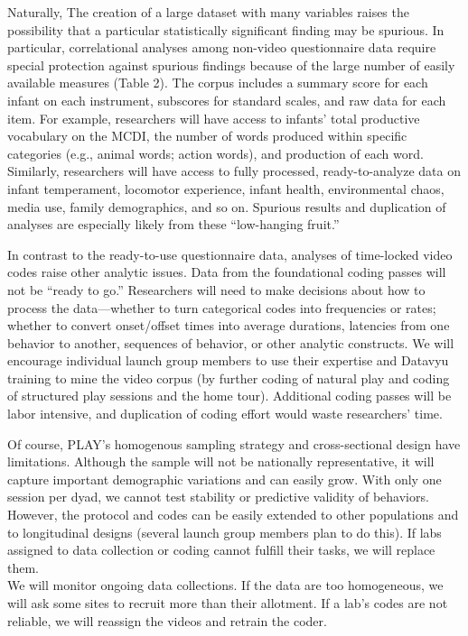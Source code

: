 \documentclass[english,man]{apa6}
\theoremstyle{definition}
\theoremstyle{definition}
\theoremstyle{definition}
\theoremstyle{remark}
\begin{document}
Naturally, The creation of a large dataset with many variables raises
the possibility that a particular statistically significant finding may
be spurious. In particular, correlational analyses among non-video
questionnaire data require special protection against spurious findings
because of the large number of easily available measures (Table 2). The
corpus includes a summary score for each infant on each instrument,
subscores for standard scales, and raw data for each item. For example,
researchers will have access to infants' total productive vocabulary on
the MCDI, the number of words produced within specific categories (e.g.,
animal words; action words), and production of each word. Similarly,
researchers will have access to fully processed, ready-to-analyze data
on infant temperament, locomotor experience, infant health,
environmental chaos, media use, family demographics, and so on. Spurious
results and duplication of analyses are especially likely from these
\enquote{low-hanging fruit.}

In contrast to the ready-to-use questionnaire data, analyses of
time-locked video codes raise other analytic issues. Data from the
foundational coding passes will not be \enquote{ready to go.}
Researchers will need to make decisions about how to process the
data---whether to turn categorical codes into frequencies or rates;
whether to convert onset/offset times into average durations, latencies
from one behavior to another, sequences of behavior, or other analytic
constructs. We will encourage individual launch group members to use
their expertise and Datavyu training to mine the video corpus (by
further coding of natural play and coding of structured play sessions
and the home tour). Additional coding passes will be labor intensive,
and duplication of coding effort would waste researchers' time.

Of course, PLAY's homogenous sampling strategy and cross-sectional
design have limitations. Although the sample will not be nationally
representative, it will capture important demographic variations and can
easily grow. With only one session per dyad, we cannot test stability or
predictive validity of behaviors. However, the protocol and codes can be
easily extended to other populations and to longitudinal designs
(several launch group members plan to do this). If labs assigned to data
collection or coding cannot fulfill their tasks, we will replace them.\\
We will monitor ongoing data collections. If the data are too
homogeneous, we will ask some sites to recruit more than their
allotment. If a lab's codes are not reliable, we will reassign the
videos and retrain the coder.
\end{document}
